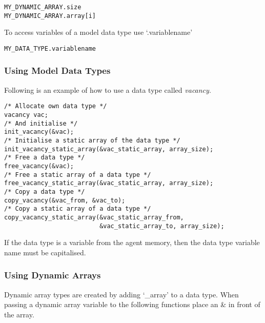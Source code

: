 \begin{mylisting}
\begin{verbatim}
MY_DYNAMIC_ARRAY.size
MY_DYNAMIC_ARRAY.array[i]
\end{verbatim}
\end{mylisting}

To access variables of a model data type use `.variablename'

\begin{mylisting}
\begin{verbatim}
MY_DATA_TYPE.variablename
\end{verbatim}
\end{mylisting}

\subsubsection{Using Model Data Types}

Following is an example of how to use a data type called
\emph{vacancy}.

\begin{mylisting}
\begin{verbatim}
/* Allocate own data type */
vacancy vac;
/* And initialise */
init_vacancy(&vac);
/* Initialise a static array of the data type */
init_vacancy_static_array(&vac_static_array, array_size);
/* Free a data type */
free_vacancy(&vac);
/* Free a static array of a data type */
free_vacancy_static_array(&vac_static_array, array_size);
/* Copy a data type */
copy_vacancy(&vac_from, &vac_to);
/* Copy a static array of a data type */
copy_vacancy_static_array(&vac_static_array_from,
                          &vac_static_array_to, array_size);
\end{verbatim}
\end{mylisting}

If the data type is a variable from the agent memory, then the data type
variable name must be capitalised.

\subsubsection{Using Dynamic Arrays}

Dynamic array types are created by adding `\_array' to a data type.
When passing a dynamic array variable to the following functions
place an \& in front of the array.

